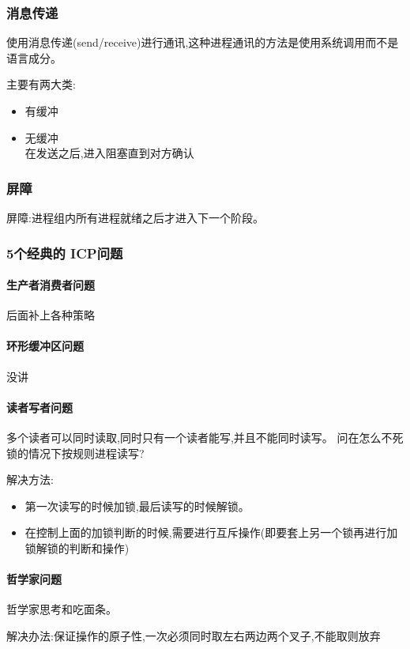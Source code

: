 \documentclass[UTF8,a4paper]{ctexart}
\begin{document}
      \subsubsection{消息传递}
      使用消息传递(send/receive)进行通讯,这种进程通讯的方法是使用系统调用而不是语言成分。

      主要有两大类:
      \begin{itemize}
        \item 有缓冲
        \item 无缓冲\\
        在发送之后,进入阻塞直到对方确认
      \end{itemize}

      \subsubsection{屏障}
      屏障:进程组内所有进程就绪之后才进入下一个阶段。

    \subsubsection{5个经典的 ICP问题}

    \paragraph{生产者消费者问题}

    {\color{red}后面补上各种策略}

    \paragraph{环形缓冲区问题}

    {\color{red}没讲}

    \paragraph{读者写者问题}
    多个读者可以同时读取,同时只有一个读者能写,并且不能同时读写。
    问在怎么不死锁的情况下按规则进程读写?

    解决方法:
    \begin{itemize}
      \item 第一次读写的时候加锁,最后读写的时候解锁。
      \item 在控制上面的加锁判断的时候,需要进行互斥操作(即要套上另一个锁再进行加锁解锁的判断和操作)
    \end{itemize}

    \paragraph{哲学家问题}
    哲学家思考和吃面条。

    解决办法:保证操作的原子性,一次必须同时取左右两边两个叉子,不能取则放弃
\end{document}
